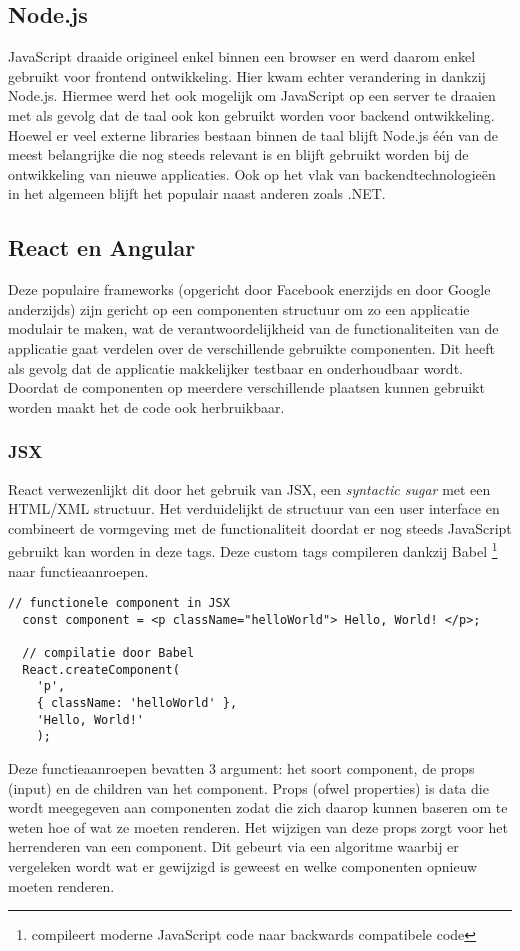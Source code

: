 \subsection{Node.js}
JavaScript draaide origineel enkel binnen een browser en werd daarom enkel gebruikt voor frontend ontwikkeling. Hier kwam echter verandering in dankzij Node.js. Hiermee werd het ook mogelijk om JavaScript op een server te draaien met als gevolg dat de taal ook kon gebruikt worden voor backend ontwikkeling. Hoewel er veel externe libraries bestaan binnen de taal blijft Node.js één van de meest belangrijke die nog steeds relevant is en blijft gebruikt worden bij de ontwikkeling van nieuwe applicaties. Ook op het vlak van backendtechnologieën in het algemeen blijft het populair naast anderen zoals .NET.

\subsection{React en Angular}
Deze populaire frameworks (opgericht door Facebook enerzijds en door Google anderzijds) zijn gericht op een componenten structuur om zo een applicatie modulair te maken, wat de verantwoordelijkheid van de functionaliteiten van de applicatie gaat verdelen over de verschillende gebruikte componenten. Dit heeft als gevolg dat de applicatie makkelijker testbaar en onderhoudbaar wordt. Doordat de componenten op meerdere verschillende plaatsen kunnen gebruikt worden maakt het de code ook herbruikbaar. 

\subsubsection{JSX}
React verwezenlijkt dit door het gebruik van JSX, een \textit{syntactic sugar} met een HTML/XML structuur. Het verduidelijkt de structuur van een user interface en combineert de vormgeving met de functionaliteit doordat er nog steeds JavaScript gebruikt kan worden in deze tags. Deze custom tags compileren dankzij Babel \footnote{compileert moderne JavaScript code naar backwards compatibele code} \autocite{Babel2019} naar functieaanroepen.
\begin{lstlisting}[caption=JSX compilatie]
  // functionele component in JSX
  const component = <p className="helloWorld"> Hello, World! </p>;  

  // compilatie door Babel
  React.createComponent(
    'p',
    { className: 'helloWorld' },
    'Hello, World!'
    );
\end{lstlisting}
Deze functieaanroepen bevatten 3 argument: het soort component, de props (input) en de children van het component. Props (ofwel properties) is data die wordt meegegeven aan componenten zodat die zich daarop kunnen baseren om te weten hoe of wat ze moeten renderen. Het wijzigen van deze props zorgt voor het herrenderen van een component. Dit gebeurt via een algoritme waarbij er vergeleken wordt wat er gewijzigd is geweest en welke componenten opnieuw moeten renderen. 

